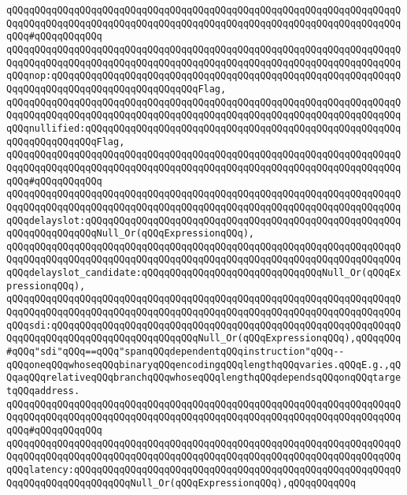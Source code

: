 \verb|qQQqqQQqqQQqqQQqqQQqqQQqqQQqqQQqqQQqqQQqqQQqqQQqqQQqqQQqqQQqqQQqqQQqqQQqqQQqqQQqqQQqqQQqqQQqqQQqqQQqqQQqqQQqqQQqqQQqqQQqqQQqqQQqqQQqqQQqqQQqqQQq#qQQqqQQqqQQq|\newline
\verb|qQQqqQQqqQQqqQQqqQQqqQQqqQQqqQQqqQQqqQQqqQQqqQQqqQQqqQQqqQQqqQQqqQQqqQQqqQQqqQQqqQQqqQQqqQQqqQQqqQQqqQQqqQQqqQQqqQQqqQQqqQQqqQQqqQQqqQQqqQQqqQQqnop:qQQqqQQqqQQqqQQqqQQqqQQqqQQqqQQqqQQqqQQqqQQqqQQqqQQqqQQqqQQqqQQqqQQqqQQqqQQqqQQqqQQqqQQqqQQqqQQqFlag,|\newline
\verb|qQQqqQQqqQQqqQQqqQQqqQQqqQQqqQQqqQQqqQQqqQQqqQQqqQQqqQQqqQQqqQQqqQQqqQQqqQQqqQQqqQQqqQQqqQQqqQQqqQQqqQQqqQQqqQQqqQQqqQQqqQQqqQQqqQQqqQQqqQQqqQQqnullified:qQQqqQQqqQQqqQQqqQQqqQQqqQQqqQQqqQQqqQQqqQQqqQQqqQQqqQQqqQQqqQQqqQQqqQQqFlag,|\newline
\verb|qQQqqQQqqQQqqQQqqQQqqQQqqQQqqQQqqQQqqQQqqQQqqQQqqQQqqQQqqQQqqQQqqQQqqQQqqQQqqQQqqQQqqQQqqQQqqQQqqQQqqQQqqQQqqQQqqQQqqQQqqQQqqQQqqQQqqQQqqQQqqQQq#qQQqqQQqqQQq|\newline
\verb|qQQqqQQqqQQqqQQqqQQqqQQqqQQqqQQqqQQqqQQqqQQqqQQqqQQqqQQqqQQqqQQqqQQqqQQqqQQqqQQqqQQqqQQqqQQqqQQqqQQqqQQqqQQqqQQqqQQqqQQqqQQqqQQqqQQqqQQqqQQqqQQqdelayslot:qQQqqQQqqQQqqQQqqQQqqQQqqQQqqQQqqQQqqQQqqQQqqQQqqQQqqQQqqQQqqQQqqQQqqQQqNull_Or(qQQqExpressionqQQq),|\newline
\verb|qQQqqQQqqQQqqQQqqQQqqQQqqQQqqQQqqQQqqQQqqQQqqQQqqQQqqQQqqQQqqQQqqQQqqQQqqQQqqQQqqQQqqQQqqQQqqQQqqQQqqQQqqQQqqQQqqQQqqQQqqQQqqQQqqQQqqQQqqQQqqQQqdelayslot_candidate:qQQqqQQqqQQqqQQqqQQqqQQqqQQqqQQqNull_Or(qQQqExpressionqQQq),|\newline
\verb|qQQqqQQqqQQqqQQqqQQqqQQqqQQqqQQqqQQqqQQqqQQqqQQqqQQqqQQqqQQqqQQqqQQqqQQqqQQqqQQqqQQqqQQqqQQqqQQqqQQqqQQqqQQqqQQqqQQqqQQqqQQqqQQqqQQqqQQqqQQqqQQqsdi:qQQqqQQqqQQqqQQqqQQqqQQqqQQqqQQqqQQqqQQqqQQqqQQqqQQqqQQqqQQqqQQqqQQqqQQqqQQqqQQqqQQqqQQqqQQqqQQqNull_Or(qQQqExpressionqQQq),qQQqqQQq#qQQq"sdi"qQQq==qQQq"spanqQQqdependentqQQqinstruction"qQQq--qQQqoneqQQqwhoseqQQqbinaryqQQqencodingqQQqlengthqQQqvaries.qQQqE.g.,qQQqaqQQqrelativeqQQqbranchqQQqwhoseqQQqlengthqQQqdependsqQQqonqQQqtargetqQQqaddress.|\newline
\verb|qQQqqQQqqQQqqQQqqQQqqQQqqQQqqQQqqQQqqQQqqQQqqQQqqQQqqQQqqQQqqQQqqQQqqQQqqQQqqQQqqQQqqQQqqQQqqQQqqQQqqQQqqQQqqQQqqQQqqQQqqQQqqQQqqQQqqQQqqQQqqQQq#qQQqqQQqqQQq|\newline
\verb|qQQqqQQqqQQqqQQqqQQqqQQqqQQqqQQqqQQqqQQqqQQqqQQqqQQqqQQqqQQqqQQqqQQqqQQqqQQqqQQqqQQqqQQqqQQqqQQqqQQqqQQqqQQqqQQqqQQqqQQqqQQqqQQqqQQqqQQqqQQqqQQqlatency:qQQqqQQqqQQqqQQqqQQqqQQqqQQqqQQqqQQqqQQqqQQqqQQqqQQqqQQqqQQqqQQqqQQqqQQqqQQqqQQqNull_Or(qQQqExpressionqQQq),qQQqqQQqqQQq|\newline
